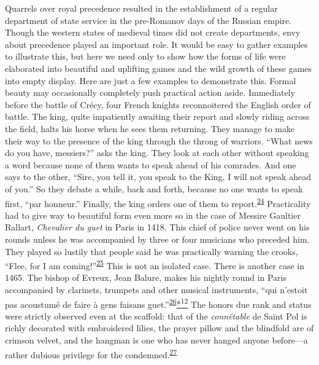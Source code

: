 Quarrels over royal precedence resulted in the establishment of a
regular department of state service in the pre-Romanov days of the
Russian empire. Though the western states of medieval times did not
create departments, envy about precedence played an important role. It
would be easy to gather examples to illustrate this, but here we need
only to show how the forms of life were elaborated into beautiful and
uplifting games and the wild growth of these games into empty display.
Here are just a few examples to demonstrate this. Formal beauty may
occasionally completely push practical action aside. Immediately before
the battle of Crécy, four French knights reconnoitered the English order
of battle. The king, quite impatiently awaiting their report and slowly
riding across the field, halts his horse when he sees them returning.
They manage to make their way to the presence of the king through the
throng of warriors. ``What news do you have, messiers?'' asks the king.
They look at each other without speaking a word because none of them
wants to speak ahead of his comrades. And one says to the other, ``Sire,
you tell it, you speak to the King, I will not speak ahead of you.'' So
they debate a while, back and forth, because no one wants to speak
first, ``par honneur.'' Finally, the king orders one of them to
report.\textsuperscript{\protect\hypertarget{09_Chapter_Two__THE_CRAVING_FOR_A_M.xhtmlux5cux23id_2039}{\protect\hyperlink{23_NOTES.xhtmlux5cux23id_2040}{24}}}
Practicality had to give way to beautiful form even more so in the case
of Messire Gaultier Rallart, \emph{Chevalier du guet} in Paris in 1418.
This chief of police never went on his rounds unless he was accompanied
by three or four musicians who preceded him. They played so lustily that
people said he was practically warning the crooks, ``Flee, for I am
coming!''\textsuperscript{\protect\hypertarget{09_Chapter_Two__THE_CRAVING_FOR_A_M.xhtmlux5cux23id_2037}{\protect\hyperlink{23_NOTES.xhtmlux5cux23id_2038}{25}}}
This is not an isolated case. There is another case in 1465. The bishop
of Evreux, Jean Balure, makes his nightly round in Paris accompanied by
clarinets, trumpets and other musical instruments, ``qui n'estoit pas
acoustumé de faire à gens faisans
guet.''\textsuperscript{\protect\hypertarget{09_Chapter_Two__THE_CRAVING_FOR_A_M.xhtmlux5cux23id_2035}{\protect\hyperlink{23_NOTES.xhtmlux5cux23id_2036}{26}}}\protect\hypertarget{09_Chapter_Two__THE_CRAVING_FOR_A_M.xhtmlux5cux23id_2433}{\protect\hyperlink{23_NOTES.xhtmlux5cux23id_2434}{*\textsuperscript{12}}}
The honors due rank and status were strictly observed even at the
scaffold: that of the \emph{connétable} de Saint Pol is richly decorated
with embroidered lilies, the prayer pillow and the blindfold are of
crimson velvet, and the hangman is one who has never hanged anyone
before---a rather dubious privilege for the
condemned.\textsuperscript{\protect\hypertarget{09_Chapter_Two__THE_CRAVING_FOR_A_M.xhtmlux5cux23id_2033}{\protect\hyperlink{23_NOTES.xhtmlux5cux23id_2034}{27}}}

